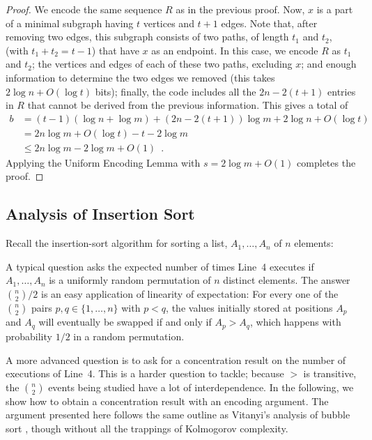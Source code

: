 \documentclass{patmorin}
\begin{document}
\begin{proof}
  We encode the same sequence $R$ as in the previous proof. Now, $x$
  is a part of a minimal subgraph having $t$ vertices and $t+1$
  edges. Note that, after removing two edges, this subgraph consists
  of two paths, of length $t_1$ and $t_2$, (with $t_1+t_2=t-1$) that
  have $x$ as an endpoint.  In this case, we encode $R$ as $t_1$ and
  $t_2$; the vertices and edges of each of these two paths, excluding
  $x$; and enough information to determine the two edges we removed
  (this takes $2\log n + O(\log t)$ bits); finally, the code includes
  all the $2n-2(t+1)$ entries in $R$ that cannot be derived from the
  previous information. This gives a total of
  \begin{align*}
     b &= (t-1)(\log n+\log m) + (2n-2(t+1))\log m + 2\log n + O(\log t) \\
        &= 2n\log m + O(\log t) - t - 2\log m \\
       & \le 2n\log m - 2\log m + O(1) \enspace .
  \end{align*}
  Applying the Uniform Encoding Lemma with $s=2\log m+O(1)$ completes
  the proof.
\end{proof}

\subsection{Analysis of Insertion Sort}

Recall the insertion-sort algorithm for sorting a list, $A_1,\ldots,A_n$
of $n$ elements:

\begin{algorithmic}[1]
     \ENDWHILE
  \ENDFOR
\end{algorithmic}

A typical question asks the expected number of times Line~4 executes
if $A_1,\ldots,A_n$ is a uniformly random permutation of $n$ distinct
elements.  The answer $\binom{n}{2}/2$ is an easy application of
linearity of expectation: For every one of the $\binom{n}{2}$ pairs
$p,q\in\{1,\ldots,n\}$ with $p<q$, the values initially stored at
positions $A_p$ and $A_q$ will eventually be swapped if and only if $A_p >
A_q$, which happens with probability $1/2$ in a random permutation.

A more advanced question is to ask for a concentration result on the
number of executions of Line~4. This is a harder question to tackle;
because $>$ is transitive, the $\binom{n}{2}$ events being studied have
a lot of interdependence. In the following, we show how to obtain a
concentration result with an encoding argument.  The argument presented
here follows the same outline as Vitanyi's analysis of bubble sort
\cite{vitanyi:analysis}, though without all the trappings of Kolmogorov complexity.
\end{document}
